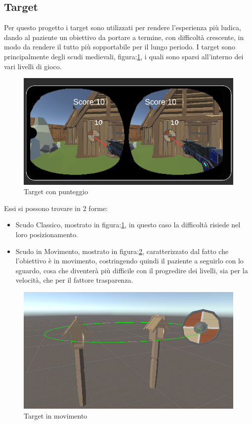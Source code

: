\documentclass[
a4paper,
cleardoublepage=empty,
headings=twolinechapter,
numbers=autoenddot,
]{scrbook}
\begin{document}
    \subsection{Target}
    Per questo progetto i target sono utilizzati per rendere l'esperienza più ludica, dando al paziente un obiettivo da portare a termine, con difficoltà crescente, in modo da rendere il tutto più sopportabile per il lungo periodo.
    I target sono principalmente degli scudi medievali, figura:\ref{fig:target_score}, i quali sono sparsi all'interno dei vari livelli di gioco.
    \begin{figure}[H]
    	\centering
    	\includegraphics[width=0.7\linewidth]{image/target_score}
    	\caption{Target con punteggio}
    	\label{fig:target_score}
    \end{figure}
    Essi si possono trovare in 2 forme:
    \begin{itemize}
    	\item Scudo Classico, mostrato in figura:\ref{fig:target_score}, in questo caso la difficoltà risiede nel loro posizionamento.
    	\item Scudo in Movimento, mostrato in figura:\ref{fig:target_movimento}, caratterizzato dal fatto che l'obiettivo è in movimento, costringendo quindi il paziente a seguirlo con lo sguardo, cosa che diventerà più difficile con il progredire dei livelli, sia per la velocità, che per il fattore trasparenza.
    \end{itemize}
    \begin{figure}[H]
    	\centering
    	\includegraphics[width=0.7\linewidth]{image/target_movimento}
    	\caption{Target in movimento}
    	\label{fig:target_movimento}
    \end{figure}
\end{document}
